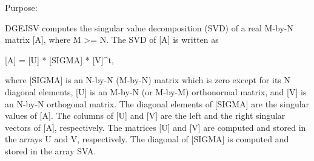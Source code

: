  \begin{DoxyParagraph}{Purpose\+: }
\begin{DoxyVerb} DGEJSV computes the singular value decomposition (SVD) of a real M-by-N
 matrix [A], where M >= N. The SVD of [A] is written as

              [A] = [U] * [SIGMA] * [V]^t,

 where [SIGMA] is an N-by-N (M-by-N) matrix which is zero except for its N
 diagonal elements, [U] is an M-by-N (or M-by-M) orthonormal matrix, and
 [V] is an N-by-N orthogonal matrix. The diagonal elements of [SIGMA] are
 the singular values of [A]. The columns of [U] and [V] are the left and
 the right singular vectors of [A], respectively. The matrices [U] and [V]
 are computed and stored in the arrays U and V, respectively. The diagonal
 of [SIGMA] is computed and stored in the array SVA.\end{DoxyVerb}
 
\end{DoxyParagraph}

